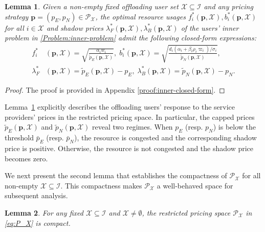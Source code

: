 \documentclass[lettersize,journal]{IEEEtran}
\newtheorem{lemma}{Lemma}
\begin{document}
\begin{lemma}\label{lem:inner-closed-form}
Given a non-empty fixed offloading user set $\mathcal{X}\subseteq\mathcal{I}$ and any pricing strategy $\boldsymbol{p}=(p_E,p_N)\in\mathcal{P}_{\mathcal{X}}$, the optimal resource usages $f_i^*(\boldsymbol{p},\mathcal{X}),b_i^*(\boldsymbol{p},\mathcal{X})$ for all ${i\in\mathcal{X}}$ and shadow prices 
$\lambda_F^*(\boldsymbol{p},\mathcal{X}),\lambda_B^*(\boldsymbol{p},\mathcal{X})$ of the users' inner problem in \eqref{Problem:inner-problem} admit the following closed-form expressions:
\begin{subequations}\label{eq:inner-closed-form-main}
\begin{align}
f_i^*&(\boldsymbol{p},\mathcal{X})
= \sqrt{\frac{\alpha_i w_i}{\tilde p_E(\boldsymbol{p},\mathcal{X})}},\;
b_i^*(\boldsymbol{p},\mathcal{X})
 = \sqrt{\frac{d_i(\alpha_i+\beta_i\rho_i\varpi_i)/\sigma_i}{\tilde p_N(\boldsymbol{p},\mathcal{X})}},\\
\lambda_F^*&(\boldsymbol{p},\mathcal{X})
= \tilde p_E(\boldsymbol{p},\mathcal{X})-p_E,\;
\lambda_B^*(\boldsymbol{p},\mathcal{X})
 = \tilde p_N(\boldsymbol{p},\mathcal{X})-p_N.
\end{align}
\end{subequations}
\end{lemma}

\begin{proof}
    The proof is provided in Appendix \ref{proof:inner-closed-form}.
\end{proof}

Lemma~\ref{lem:inner-closed-form} explicitly describes the offloading users' response to the service providers' prices in the restricted pricing space. In particular, the capped prices $\tilde p_E(\boldsymbol{p},\mathcal{X})$ and $\tilde p_N(\boldsymbol{p},\mathcal{X})$ reveal two regimes.
When $p_E$ (resp. $p_N$) is below the threshold $\bar p_E$ (resp. $\bar p_N$), the resource is congested and the corresponding shadow price is positive.
Otherwise, the resource is not congested and the shadow price becomes zero.

We next present the second lemma that establishes the compactness of $\mathcal{P}_{\mathcal{X}}$ for all non-empty $\mathcal{X}\subseteq\mathcal{I}$. This compactness makes $\mathcal{P}_{\mathcal{X}}$ a well-behaved space for subsequent analysis.
\begin{lemma}\label{lem:exact-P_X-compact}
    For any fixed $\mathcal{X}\subseteq\mathcal{I}$ and $\mathcal{X}\ne\emptyset$, the restricted pricing space $\mathcal{P}_{\mathcal{X}}$ in \eqref{eq:P_X} is compact.
\end{lemma}
\end{document}
